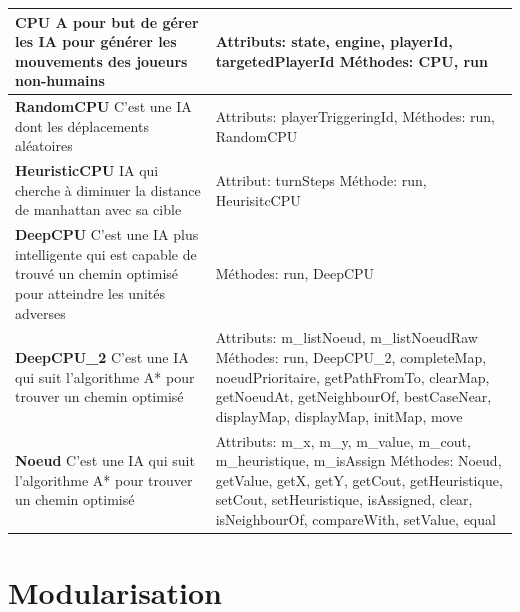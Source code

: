\phantom{Texte invisible parce que j'ai pas trouvé d'autre méthode pour mettre le tableau à la ligne.}
\begin{tabularx}{15 cm}{|X|X|}
\hline
\textbf{CPU} \newline A pour but de gérer les IA pour générer les mouvements des joueurs non-humains & Attributs: state, engine, playerId, targetedPlayerId   \newline Méthodes: CPU, run\\ 
\hline
\textbf{RandomCPU} \newline C'est une IA dont les déplacements aléatoires & Attributs: playerTriggeringId,  \newline Méthodes: run, RandomCPU\\
\hline
\textbf{HeuristicCPU} \newline IA qui cherche à diminuer la distance de manhattan avec sa cible & Attribut: turnSteps \newline Méthode: run, HeurisitcCPU\\
\hline
\textbf{DeepCPU} \newline C'est une IA plus intelligente qui est capable de trouvé un chemin optimisé pour atteindre les unités adverses & 
\newline Méthodes: run, DeepCPU\\
\hline
\textbf{DeepCPU\_2} \newline C'est une IA qui suit l'algorithme A* pour trouver un chemin optimisé & Attributs: m\_listNoeud, m\_listNoeudRaw
\newline Méthodes: run, DeepCPU\_2, completeMap, noeudPrioritaire, getPathFromTo, clearMap, getNoeudAt, getNeighbourOf, bestCaseNear, displayMap, displayMap, initMap, move\\
\hline
\textbf{Noeud} \newline C'est une IA qui suit l'algorithme A* pour trouver un chemin optimisé & Attributs: m\_x, m\_y, m\_value, m\_cout, m\_heuristique, m\_isAssign
\newline Méthodes: Noeud, getValue, getX, getY, getCout, getHeuristique, setCout, setHeuristique, isAssigned, clear, isNeighbourOf, compareWith, setValue, equal\\
\hline

\end{tabularx}





\section{Modularisation}

